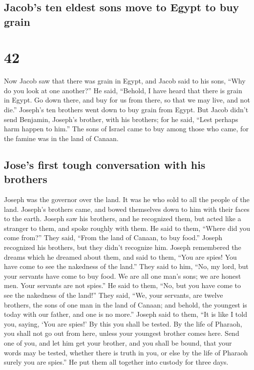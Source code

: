 \hypertarget{jacobs-ten-eldest-sons-move-to-egypt-to-buy-grain}{%
\subsection{Jacob's ten eldest sons move to Egypt to buy
grain}\label{jacobs-ten-eldest-sons-move-to-egypt-to-buy-grain}}

\hypertarget{section-41}{%
\section{42}\label{section-41}}

 Now Jacob saw that there was grain in Egypt, and Jacob
said to his sons, ``Why do you look at one another?''  He
said, ``Behold, I have heard that there is grain in Egypt. Go down
there, and buy for us from there, so that we may live, and not die.''
 Joseph's ten brothers went down to buy grain from Egypt.
 But Jacob didn't send Benjamin, Joseph's brother, with
his brothers; for he said, ``Lest perhaps harm happen to him.''
 The sons of Israel came to buy among those who came, for
the famine was in the land of Canaan.

\hypertarget{joses-first-tough-conversation-with-his-brothers}{%
\subsection{Jose's first tough conversation with his
brothers}\label{joses-first-tough-conversation-with-his-brothers}}

 Joseph was the governor over the land. It was he who sold
to all the people of the land. Joseph's brothers came, and bowed
themselves down to him with their faces to the earth. 
Joseph saw his brothers, and he recognized them, but acted like a
stranger to them, and spoke roughly with them. He said to them, ``Where
did you come from?'' They said, ``From the land of Canaan, to buy
food.''  Joseph recognized his brothers, but they didn't
recognize him.  Joseph remembered the dreams which he
dreamed about them, and said to them, ``You are spies! You have come to
see the nakedness of the land.''  They said to him, ``No,
my lord, but your servants have come to buy food.  We are
all one man's sons; we are honest men. Your servants are not spies.''
 He said to them, ``No, but you have come to see the
nakedness of the land!''  They said, ``We, your servants,
are twelve brothers, the sons of one man in the land of Canaan; and
behold, the youngest is today with our father, and one is no more.''
 Joseph said to them, ``It is like I told you, saying,
`You are spies!'  By this you shall be tested. By the
life of Pharaoh, you shall not go out from here, unless your youngest
brother comes here.  Send one of you, and let him get
your brother, and you shall be bound, that your words may be tested,
whether there is truth in you, or else by the life of Pharaoh surely you
are spies.''  He put them all together into custody for
three days.


